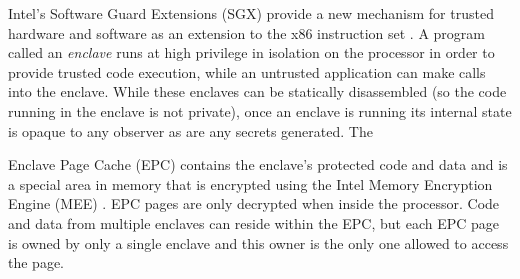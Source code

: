 Intel's Software Guard Extensions (SGX) provide a new mechanism for trusted
hardware and software as an extension to the x86 instruction set \cite{sgx,
mckeen2013innovative}.  A program called an \textit{enclave} runs at high
privilege in isolation on the processor in order to provide trusted code
execution, while an untrusted application can make calls into the enclave.
While these enclaves can be statically disassembled (so the code running in the
enclave is not private), once an enclave is running its internal state is
opaque to any observer as are any secrets generated.  The 

Enclave Page Cache (EPC) contains the enclave's protected code and data and is
a special area in memory that is encrypted using the Intel Memory Encryption
Engine (MEE) \cite{sgx3}.  EPC pages are only decrypted when inside the
processor.  Code and data from multiple enclaves can reside within the EPC, but
each EPC page is owned by only a single enclave and this owner is the only one
allowed to access the page.

